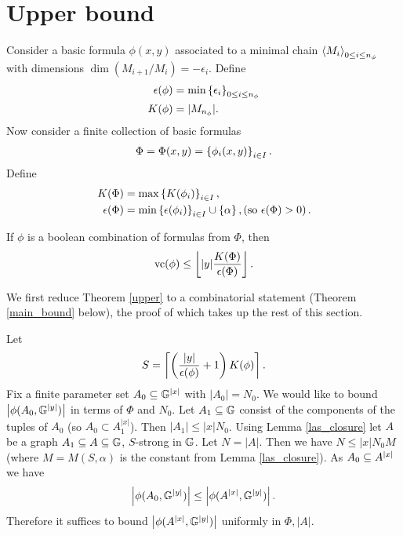 \section{Upper bound}
Consider a basic formula $\phi(x,y)$ associated to a minimal chain  $\left\langle M_i \right\rangle_{0 \leq i \leq n_{\phi}}$ with dimensions  $\dim(M_{i+1}/M_i) = -\epsilon_i$.
Define
\begin{align*}
  \epsilon(\phi) &= \min \left\{\epsilon_i\right\}_{0 \leq i \leq n_\phi}\\
  K(\phi) &= |M_{n_\phi}|.
\end{align*}
Now consider a finite collection of basic formulas
\begin{align*}
  \Phi = \Phi( x, y) = \left\{\phi_i( x,  y)\right\}_{i\in I}.
\end{align*}
Define
\begin{align*}
  K(\Phi) &= \max \left\{K(\phi_i)\right\}_{i \in I}, \\
  \epsilon(\Phi) &= \min \left\{\epsilon(\phi_i)\right\}_{i \in I} \cup \left\{\alpha\right\}, \left(\text{so }  \epsilon(\Phi) > 0\right).
\end{align*}
\begin{Theorem} \label{upper}
  If $\phi$ is a boolean combination of formulas from $\Phi$, then
  \begin{align*}
    \operatorname{vc}(\phi) \leq \left \lfloor |y|\frac{K(\Phi)}{\epsilon(\Phi)} \right \rfloor.    
  \end{align*}
\end{Theorem}
We first reduce Theorem \ref{upper} to a combinatorial statement (Theorem \ref{main_bound} below), the proof of which
takes up the rest of this section.

Let
\begin{align*}
  S = \left\lceil{\left(\frac{|y|}{\epsilon(\phi)} + 1\right) K(\phi)}\right\rceil.
\end{align*}
Fix a finite parameter set $A_0 \subseteq \mathbb G^{|x|}$ with $|A_0| = N_0$.
We would like to bound $\left|\phi(A_0, \mathbb G^{|y|})\right|$ in terms of $\Phi$ and $N_0$.
Let $A_1 \subseteq \mathbb G$ consist of the components of the tuples of $A_0$ (so $A_0 \subset A_1^{|x|}$).
Then $|A_1| \leq |x| N_0$.
Using Lemma \ref{las_closure} let $A$ be a graph $A_1 \subseteq A \subseteq \mathbb G$, $S$-strong in $\mathbb G$.
Let $N = |A|$.
Then we have $N \leq |x| N_0 M$ (where $M = M(S, \alpha)$ is the constant from Lemma \ref{las_closure}).
As $A_0 \subseteq A^{|x|}$ we have
\begin{align*}
  \left|\phi(A_0, \mathbb G^{|y|})\right| \leq \left|\phi(A^{|x|}, \mathbb G^{|y|})\right|.
\end{align*}
Therefore it suffices to bound $\left|\phi(A^{|x|}, \mathbb G^{|y|})\right|$ uniformly in $\Phi, |A|$.

